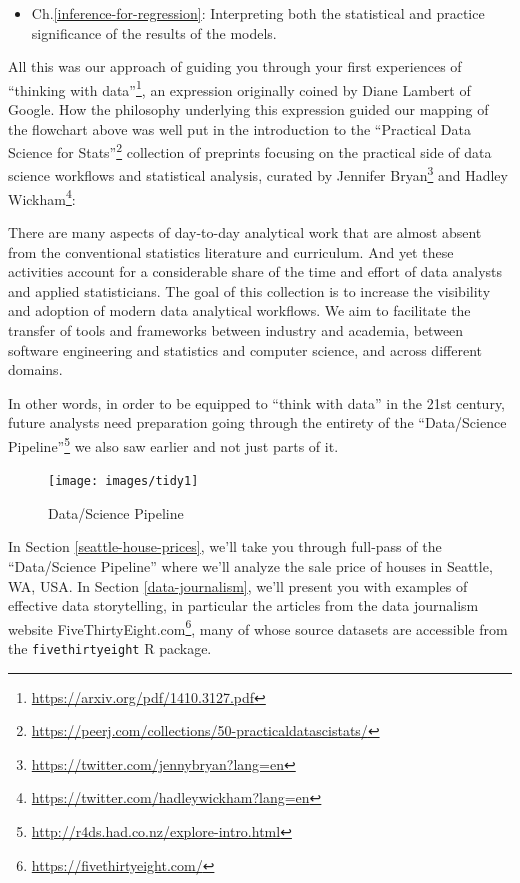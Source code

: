\documentclass[12pt, krantz2,]{krantz}
\providecommand{\tightlist}{%
  \setlength{\itemsep}{0pt}\setlength{\parskip}{0pt}}
\renewenvironment{quote}{\begin{VF}}{\end{VF}}
\renewcommand{\href}[2]{#2\footnote{\url{#1}}}
\begin{document}
\begin{enumerate}
  \begin{itemize}
  \tightlist
  \item
    Ch.\ref{inference-for-regression}: Interpreting both the statistical and practice significance of the results of the models.
  \end{itemize}
\end{enumerate}

All this was our approach of guiding you through your first experiences of \href{https://arxiv.org/pdf/1410.3127.pdf}{``thinking with data''}, an expression originally coined by Diane Lambert of Google. How the philosophy underlying this expression guided our mapping of the flowchart above was well put in the introduction to the \href{https://peerj.com/collections/50-practicaldatascistats/}{``Practical Data Science for Stats''} collection of preprints focusing on the practical side of data science workflows and statistical analysis, curated by \href{https://twitter.com/jennybryan?lang=en}{Jennifer Bryan} and \href{https://twitter.com/hadleywickham?lang=en}{Hadley Wickham}:

\begin{quote}
There are many aspects of day-to-day analytical work that are almost absent from the conventional statistics literature and curriculum. And yet these activities account for a considerable share of the time and effort of data analysts and applied statisticians. The goal of this collection is to increase the visibility and adoption of modern data analytical workflows. We aim to facilitate the transfer of tools and frameworks between industry and academia, between software engineering and statistics and computer science, and across different domains.
\end{quote}

In other words, in order to be equipped to ``think with data'' in the 21st century, future analysts need preparation going through the entirety of the \href{http://r4ds.had.co.nz/explore-intro.html}{``Data/Science Pipeline''} we also saw earlier and not just parts of it.

\begin{figure}

{\centering \texttt{[image: images/tidy1]} 

}

\caption{Data/Science Pipeline}\label{fig:pipeline-figure-conclusion}
\end{figure}

In Section \ref{seattle-house-prices}, we'll take you through full-pass of the ``Data/Science Pipeline'' where we'll analyze the sale price of houses in Seattle, WA, USA. In Section \ref{data-journalism}, we'll present you with examples of effective data storytelling, in particular the articles from the data journalism website \href{https://fivethirtyeight.com/}{FiveThirtyEight.com}, many of whose source datasets are accessible from the \texttt{fivethirtyeight} R package.
\end{document}
